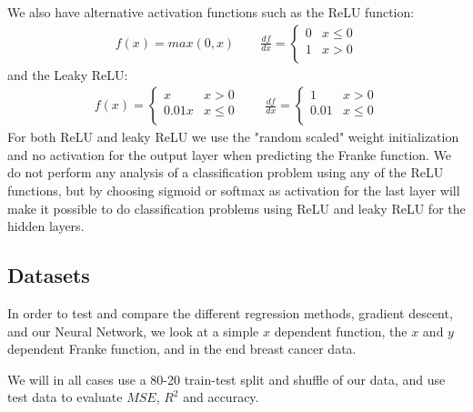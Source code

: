 \documentclass[11pt]{article}
\begin{document}
We also have alternative activation functions such as the ReLU function:
\begin{align*}
    f(x) = max(0, x) \quad\quad \frac{df }{dx} =
    \begin{cases}
        0 & x\leq 0 \\
        1 & x > 0   \\
    \end{cases}
\end{align*}
and the Leaky ReLU:
\begin{align*}
    f(x) =
    \begin{cases}
        x     & x > 0    \\
        0.01x & x \leq 0 \\
    \end{cases}
    \quad\quad \frac{df }{dx} =
    \begin{cases}
        1    & x > 0    \\
        0.01 & x \leq 0 \\
    \end{cases}
\end{align*}
For both ReLU and leaky ReLU we use the "random scaled" weight initialization and no activation for the output layer when predicting the Franke function. We do not perform any analysis of a classification problem using any of the ReLU functions, but by choosing sigmoid or softmax \cite{softmax} as activation for the last layer will make it possible to do classification problems using ReLU and leaky ReLU for the hidden layers.

\subsection{Datasets}
In order to test and compare the different regression methods, gradient descent, and our Neural Network, we look at a simple $x$ dependent function, the $x$ and $y$ dependent Franke function, and in the end breast cancer data.

We will in all cases use a 80-20 train-test split and shuffle of our data, and use test data to evaluate $MSE$, $R^2$ and accuracy.
\end{document}
